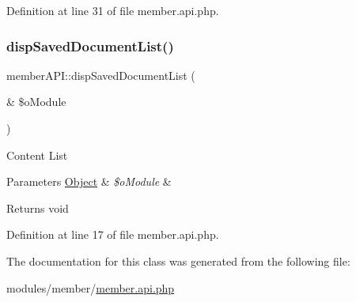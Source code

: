 Definition at line 31 of file member.\+api.\+php.

\mbox{\label{classmemberAPI_ab5fd91bb448c7ba48304a12965b81a54}} 
\subsubsection{\texorpdfstring{disp\+Saved\+Document\+List()}{dispSavedDocumentList()}}
{\footnotesize\ttfamily member\+A\+P\+I\+::disp\+Saved\+Document\+List (\begin{DoxyParamCaption}\item[{\&}]{\$o\+Module }\end{DoxyParamCaption})}

Content List


\begin{DoxyParams}[1]{Parameters}
\hyperlink{classObject}{Object} & {\em \$o\+Module} & \\
\hline
\end{DoxyParams}
\begin{DoxyReturn}{Returns}
void 
\end{DoxyReturn}


Definition at line 17 of file member.\+api.\+php.



The documentation for this class was generated from the following file\+:\begin{DoxyCompactItemize}
\item 
modules/member/\hyperlink{member_8api_8php}{member.\+api.\+php}\end{DoxyCompactItemize}
